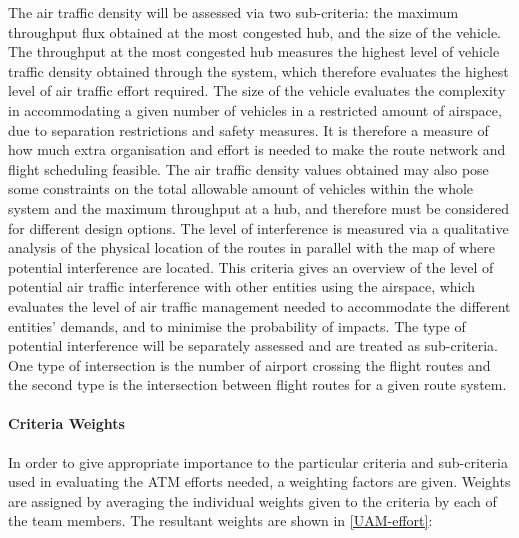The air traffic density will be assessed via two sub-criteria: the maximum throughput flux obtained at the most congested hub, and the size of the vehicle. The throughput at the most congested hub measures the highest level of vehicle traffic density obtained through the system, which therefore evaluates the highest level of air traffic effort required. The size of the vehicle evaluates the complexity in accommodating a given number of vehicles in a restricted amount of airspace, due to separation restrictions and safety measures. It is therefore a measure of how much extra organisation and effort is needed to make the route network and flight scheduling feasible. The air traffic density values obtained may also pose some constraints on the total allowable amount of vehicles within the whole system and the maximum throughput at a hub, and therefore must be considered for different design options.
The level of interference is measured via a qualitative analysis of the physical location of the routes in parallel with the map of where potential interference are located. This criteria gives an overview of the level of potential air traffic interference with other entities using the airspace, which evaluates the level of air traffic management needed to accommodate the different entities' demands, and to minimise the probability of impacts. The type of potential interference will be separately assessed and are treated as sub-criteria. One type of intersection is the number of airport crossing the flight routes and the second type is the intersection between flight routes for a given route system. 

\paragraph{Criteria Weights}
In order to give appropriate importance to the particular criteria and sub-criteria used in evaluating the ATM efforts needed, a weighting factors are given. Weights are assigned by averaging the individual weights given to the criteria by each of the team members. The resultant weights are shown in \autoref{UAM-effort}: 

